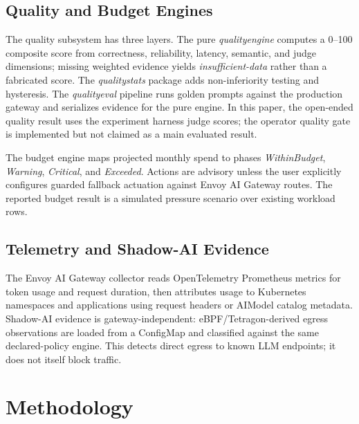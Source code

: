 \documentclass[10pt,journal,compsoc]{IEEEtran}
\begin{document}
\subsection{Quality and Budget Engines}
The quality subsystem has three layers. The pure \emph{qualityengine} computes a
0--100 composite score from correctness, reliability, latency, semantic, and
judge dimensions; missing weighted evidence yields \emph{insufficient-data}
rather than a fabricated score. The \emph{qualitystats} package adds
non-inferiority testing and hysteresis. The \emph{qualityeval} pipeline runs
golden prompts against the production gateway and serializes evidence for the
pure engine. In this paper, the open-ended quality result uses the experiment
harness judge scores; the operator quality gate is implemented but not claimed
as a main evaluated result.

The budget engine maps projected monthly spend to phases
\emph{WithinBudget}, \emph{Warning}, \emph{Critical}, and \emph{Exceeded}.
Actions are advisory unless the user explicitly configures guarded fallback
actuation against Envoy AI Gateway routes. The reported budget result is a
simulated pressure scenario over existing workload rows.

\subsection{Telemetry and Shadow-AI Evidence}
The Envoy AI Gateway collector reads OpenTelemetry Prometheus metrics for token
usage and request duration, then attributes usage to Kubernetes namespaces and
applications using request headers or AIModel catalog metadata. Shadow-AI
evidence is gateway-independent: eBPF/Tetragon-derived egress observations are
loaded from a ConfigMap and classified against the same declared-policy engine.
This detects direct egress to known LLM endpoints; it does not itself block
traffic.

\section{Methodology}
\end{document}
